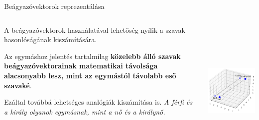 \documentclass[english, aspectratio=169]{beamer}
\begin{document}
\begin{frame}{Beágyazóvektorok reprezentálása}
\begin{columns}
\begin{column}{.5\textwidth}
A beágyazóvektorok használatával lehetőség nyílik a szavak hasonlóságának kiszámítására.\par\smallskip
Az egymáshoz jelentés tartalmilag \textbf{közelebb álló szavak beágyazóvektorainak matematikai távolsága alacsonyabb lesz, mint az egymástól távolabb eső szavaké}.
\par\smallskip
Ezáltal továbbá lehetséges analógiák kiszámítása is. \emph{A férfi és a király olyanok egymásnak, mint a nő és a királynő.}
\end{column}
\begin{column}{.5\textwidth}
\begin{center}
\includegraphics[width=7cm, height=7cm, keepaspectratio]{images/embedding_vectors_.png}
\end{center}
\end{column}
\end{columns}
\end{frame}
\end{document}
